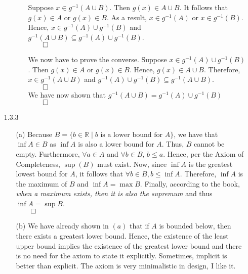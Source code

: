 \documentclass[11pt]{article}
\newcommand{\reals}{\mathbb{R}}
\begin{document}
\begin{itemize}
\begin{itemize}
\begin{itemize}
                    Suppose $x \in g^{-1}(A \cup B)$. Then $g(x) \in A \cup B$.
                    It follows that $g(x) \in A$ or $g(x) \in B$. As a result,
                    $x \in g^{-1}(A)$ or $x \in g^{-1}(B)$. Hence, $x \in
                    g^{-1}(A) \cup g^{-1}(B)$ and $g^{-1}(A \cup B) \subseteq
                    g^{-1}(A) \cup g^{-1}(B)$.\\
                    $\qed$

                    \newpage

                    We now have to prove the converse. Suppose $x \in g^{-1}(A)
                    \cup g^{-1}(B)$. Then $g(x) \in A$ or $g(x) \in B$. Hence,
                    $g(x) \in A \cup B$. Therefore, $x \in g^{-1}(A \cup B)$
                    and $g^{-1}(A) \cup g^{-1}(B) \subseteq g^{-1}(A \cup B)$.
                    \\
                    $\qed$\\

                    We have now shown that $g^{-1}(A \cup B) = g^{-1}(A) \cup
                    g^{-1}(B)$\\
                    $\qed$

                \end{itemize}

        \end{itemize}

    \item[1.3.3]
        \begin{itemize}
            \item[(a)]
                Because $B = \{b \in \reals \mid b \text{ is a lower bound for
                } A\}$, we have that $\inf{A} \in B$ as $\inf{A}$ is also a
                lower bound for $A$. Thus, $B$ cannot be empty. Furthermore,
                $\forall a \in A$ and $\forall b \in B$, $b \leq a$. Hence, per
                the Axiom of Completeness, $\sup(B)$ must exist. Now, since
                $\inf{A}$ is the greatest lowest bound for $A$, it follows that
                $\forall b \in B, b \leq \inf{A}$. Therefore, $\inf{A}$ is the
                maximum of $B$ and $\inf{A} = \max{B}$. Finally, according to
                the book, \textit{when a maximum exists, then it is also the
                supremum} and thus $\inf{A} = \sup{B}$.\\
                $\qed$

            \item[(b)]
                We have already shown in $(a)$ that if $A$ is bounded below,
                then there exists a greatest lower bound. Hence, the existence
                of the least upper bound implies the existence of the greatest
                lower bound and there is no need for the axiom to state it
                explicitly. Sometimes, implicit is better than explicit. The
                axiom is very minimalistic in design, I like it.
        \end{itemize}


\end{itemize}
\end{document}
